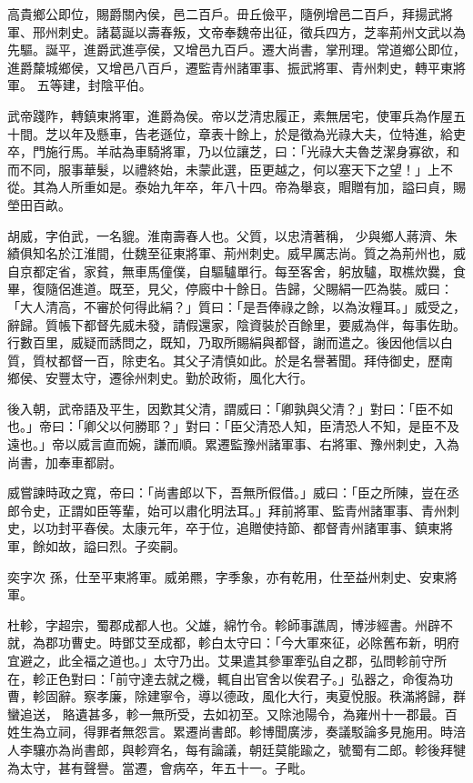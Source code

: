 \begin{pinyinscope}
 高貴鄉公即位，賜爵關內侯，邑二百戶。毌丘儉平，隨例增邑二百戶，拜揚武將軍、邢州刺史。諸葛誕以壽春叛，文帝奉魏帝出征，徵兵四方，芝率荊州文武以為先驅。誕平，進爵武進亭侯，又增邑九百戶。遷大尚書，掌刑理。常道鄉公即位，進爵斄城鄉侯，又增邑八百戶，遷監青州諸軍事、振武將軍、青州刺史，轉平東將軍。
 五等建，封陰平伯。



 武帝踐阼，轉鎮東將軍，進爵為侯。帝以芝清忠履正，素無居宅，使軍兵為作屋五十間。芝以年及懸車，告老遜位，章表十餘上，於是徵為光祿大夫，位特進，給吏卒，門施行馬。羊祜為車騎將軍，乃以位讓芝，曰：「光祿大夫魯芝潔身寡欲，和而不同，服事華髮，以禮終始，未蒙此選，臣更越之，何以塞天下之望！」上不從。其為人所重如是。泰始九年卒，年八十四。帝為舉哀，賵贈有加，謚曰貞，賜塋田百畝。



 胡威，字伯武，一名貔。淮南壽春人也。父質，以忠清著稱，
 少與鄉人蔣濟、朱績俱知名於江淮間，仕魏至征東將軍、荊州刺史。威早厲志尚。質之為荊州也，威自京都定省，家貧，無車馬僮僕，自驅驢單行。每至客舍，躬放驢，取樵炊爨，食畢，復隨侶進道。既至，見父，停廄中十餘日。告歸，父賜絹一匹為裝。威曰：「大人清高，不審於何得此絹？」質曰：「是吾俸祿之餘，以為汝糧耳。」威受之，辭歸。質帳下都督先威未發，請假還家，陰資裝於百餘里，要威為伴，每事佐助。行數百里，威疑而誘問之，既知，乃取所賜絹與都督，謝而遣之。後因他信以白質，質杖都督一百，除吏名。其父子清慎如此。於是名譽著聞。拜侍御史，歷南
 鄉侯、安豐太守，遷徐州刺史。勤於政術，風化大行。



 後入朝，武帝語及平生，因歎其父清，謂威曰：「卿孰與父清？」對曰：「臣不如也。」帝曰：「卿父以何勝耶？」對曰：「臣父清恐人知，臣清恐人不知，是臣不及遠也。」帝以威言直而婉，謙而順。累遷監豫州諸軍事、右將軍、豫州刺史，入為尚書，加奉車都尉。



 威嘗諫時政之寬，帝曰：「尚書郎以下，吾無所假借。」威曰：「臣之所陳，豈在丞郎令史，正謂如臣等輩，始可以肅化明法耳。」拜前將軍、監青州諸軍事、青州刺史，以功封平春侯。太康元年，卒于位，追贈使持節、都督青州諸軍事、鎮東將軍，餘如故，謚曰烈。子奕嗣。



 奕字次
 孫，仕至平東將軍。威弟羆，字季象，亦有乾用，仕至益州刺史、安東將軍。



 杜軫，字超宗，蜀郡成都人也。父雄，綿竹令。軫師事譙周，博涉經書。州辟不就，為郡功曹史。時鄧艾至成都，軫白太守曰：「今大軍來征，必除舊布新，明府宜避之，此全福之道也。」太守乃出。艾果遣其參軍牽弘自之郡，弘問軫前守所在，軫正色對曰：「前守達去就之機，輒自出官舍以俟君子。」弘器之，命復為功曹，軫固辭。察孝廉，除建寧令，導以德政，風化大行，夷夏悅服。秩滿將歸，群蠻追送，
 賂遺甚多，軫一無所受，去如初至。又除池陽令，為雍州十一郡最。百姓生為立祠，得罪者無怨言。累遷尚書郎。軫博聞廣涉，奏議駁論多見施用。時涪人李驤亦為尚書郎，與軫齊名，每有論議，朝廷莫能踰之，號蜀有二郎。軫後拜犍為太守，甚有聲譽。當遷，會病卒，年五十一。子毗。




\end{pinyinscope}
